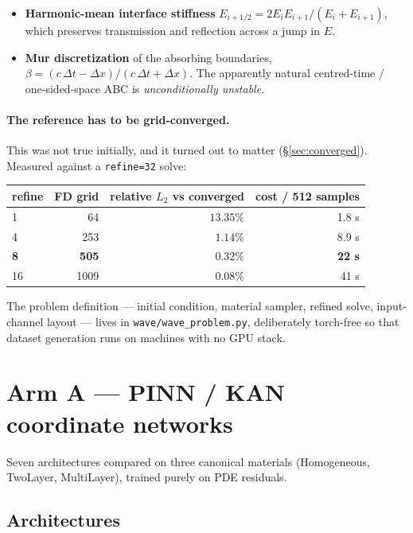 \documentclass[11pt,a4paper]{article}
\newcommand{\relL}{relative $L_2$}
\begin{document}
\begin{itemize}[leftmargin=*,itemsep=2pt]
\item \textbf{Harmonic-mean interface stiffness}
$E_{i+1/2}=2E_iE_{i+1}/(E_i+E_{i+1})$, which preserves transmission and
reflection across a jump in $E$.
\item \textbf{Mur discretization} of the absorbing boundaries,
$\beta=(c\,\Delta t-\Delta x)/(c\,\Delta t+\Delta x)$. The apparently natural
centred-time / one-sided-space ABC is \emph{unconditionally unstable}.
\end{itemize}

\paragraph{The reference has to be grid-converged.} This was not true initially,
and it turned out to matter (\S\ref{sec:converged}). Measured against a
\texttt{refine=32} solve:

\begin{center}
\small
\begin{tabular}{lrrr}
\toprule
\textbf{refine} & \textbf{FD grid} & \textbf{\relL{} vs converged} & \textbf{cost / 512 samples}\\
\midrule
1  & 64   & $13.35\%$ & 1.8 s\\
4  & 253  & $1.14\%$  & 8.9 s\\
\textbf{8} & \textbf{505} & $\mathbf{0.32\%}$ & \textbf{22 s}\\
16 & 1009 & $0.08\%$  & 41 s\\
\bottomrule
\end{tabular}
\end{center}

The problem definition --- initial condition, material sampler, refined solve,
input-channel layout --- lives in \texttt{wave/wave\_problem.py}, deliberately
torch-free so that dataset generation runs on machines with no GPU stack.

\section{Arm A --- PINN / KAN coordinate networks}

Seven architectures compared on three canonical materials (Homogeneous,
TwoLayer, MultiLayer), trained purely on PDE residuals.

\subsection{Architectures}
\end{document}

